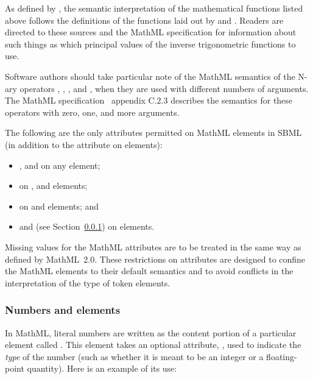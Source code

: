 As defined by \mathmltwo, the semantic interpretation of the
mathematical functions listed above follows the definitions of the
functions laid out by \cite{abramowitz:1997} and
\cite{zwillinger:1988}.  Readers are directed to these sources and
the MathML specification for information about such things as
which principal values of the inverse trigonometric functions to
use.

Software authors should take particular note of the MathML
semantics of the N-ary operators , ,
,  and , when they are used with
different numbers of arguments.  The MathML
specification~\citep{w3c:2000b} appendix C.2.3 describes the
semantics for these operators with zero, one, and more arguments.

The following are the only attributes permitted on MathML elements
in SBML (in addition to the  attribute on
 elements):
\begin{itemize}\setlength{\parskip}{-0.2ex}

\item {},  and  on any element;

\item {} on ,
     and  elements;

\item {} on 
    and  elements; and

\item {} and 
  (see Section~\ref{sec:cn-token}) on  elements.

\end{itemize}\vspace*{-0.75ex}
Missing values for the MathML attributes are to be treated in the
same way as defined by MathML~2.0.  These restrictions on
attributes are designed to confine the MathML elements to their
default semantics and to avoid conflicts in the interpretation of
the type of token elements.


\subsubsection{Numbers and  elements}
\label{sec:cn-token}
\label{sec:mathml-value-space}

In MathML, literal numbers are written as the content portion of a
particular element called .  This element takes an
optional attribute, , used to indicate the \emph{type}
of the number (such as whether it is meant to be an integer or a
floating-point quantity).  Here is an example of its use:

